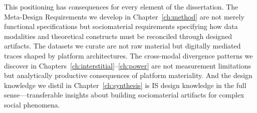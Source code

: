 \documentclass[../main.tex]{subfiles}
\begin{document}
This positioning has consequences for every element of the dissertation. The Meta-Design Requirements we develop in Chapter~\ref{ch:method} are not merely functional specifications but sociomaterial requirements specifying how data modalities and theoretical constructs must be reconciled through designed artifacts. The datasets we curate are not raw material but digitally mediated traces shaped by platform architectures. The cross-modal divergence patterns we discover in Chapters~\ref{ch:interstitial}--\ref{ch:power} are not measurement limitations but analytically productive consequences of platform materiality. And the design knowledge we distil in Chapter~\ref{ch:synthesis} is IS design knowledge in the full sense---transferable insights about building sociomaterial artifacts for complex social phenomena.

\end{document}

